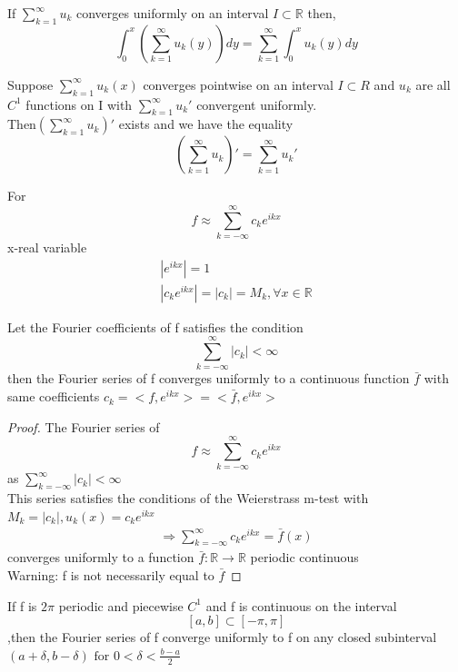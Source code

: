 \begin{proposition}[]{}
If $ \sum_{k=1}^{\infty}u_k $ converges uniformly on an interval $ I\subset \mathbb{R} $ then,$$
    \int_{0}^{x}(\sum_{k=1}^{\infty}u_k(y))dy=\sum_{k=1}^{\infty}\int_{0}^{x}u_k(y)dy
$$ 
\end{proposition}
\begin{proposition}[]{}
Suppose $\sum_{k=1}^{\infty}u_k(x)$ converges pointwise on an interval $I\subset R  $ and $ u_k $ are all $ C^1 $ functions on I with $ \sum_{k=1}^{\infty}u_k' $ convergent uniformly.
\\Then$ (\sum_{k=1}^{\infty}u_k)' $ exists and we have the equality $$
(\sum_{k=1}^{\infty}u_k)'=\sum_{k=1}^{\infty}u_k'
$$     
\end{proposition}
For$$
f \approx \sum_{k=-\infty}^{\infty}c_ke^{ikx}
$$ 
x-real variable
\begin{align*}{}{}
|e^{ikx}|=1\\
|c_ke^{ikx}|=|c_k| =M_k,\forall x\in\mathbb{R}
\end{align*}
\begin{theorem}[]{}
Let the Fourier coefficients of f satisfies the condition$$
  \sum_{k=-\infty}^{\infty}|c_k|<\infty
$$ then the Fourier series of f converges uniformly to a continuous function $ \bar{f} $ with same coefficients $ c_k=<f,e^{ikx}>=<\bar{f},e^{ikx}> $  
\end{theorem}
\begin{proof}
    The Fourier series of $$
        f\approx\sum_{k=-\infty}^{\infty}c_ke^{ikx}
    $$ as $\sum_{k=-\infty}^{\infty}|c_k|<\infty$
    \\This series satisfies the conditions of the Weierstrass m-test with $ M_k=|c_k| ,u_k(x)=c_ke^{ikx}$
    \begin{align*}{}{}
    \Rightarrow \sum_{k=-\infty}^{\infty}c_ke^{ikx}= \bar{f} (x)
    \end{align*}
    converges uniformly to a  function $ \bar{f}:\mathbb{R}\rightarrow\mathbb{R} $ periodic continuous
    \\Warning: f is not necessarily equal to $ \bar{f} $
\end{proof}
\begin{corollary}
    If f is $ 2\pi $  periodic and piecewise $ C^1 $  and f is continuous on the interval$$
       [a,b]\subset [-\pi,\pi]
    $$ ,then the Fourier series of f converge uniformly to f on any closed subinterval $(a+\delta,b-\delta) \text{ for }0<\delta<\frac{b-a}{2} $ 
\end{corollary}